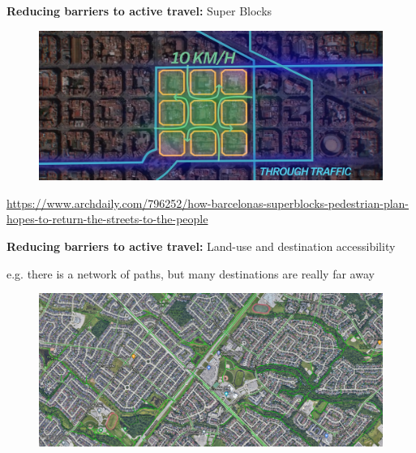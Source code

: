 \documentclass[aspectratio=169]{beamer}
\begin{document}
\begin{frame}
	
	\textbf{Reducing barriers to active travel:} Super Blocks
	
	\begin{figure}
		\centering
		\includegraphics[width=0.8\linewidth]{images/super_blocks.png}
	\end{figure}
	
	\tiny 
	\url{https://www.archdaily.com/796252/how-barcelonas-superblocks-pedestrian-plan-hopes-to-return-the-streets-to-the-people}
	
	
	
\end{frame}



\begin{frame}
	
	\textbf{Reducing barriers to active travel:} Land-use and destination accessibility
	
	\vspace{2mm}
	
	e.g. there is a network of paths, but many destinations are really far away
	
	\begin{figure}
		\centering
		\includegraphics[width=1\linewidth]{images/suburb_bike_lanes.png}
	\end{figure}
	
%	
%	
%	
		
\end{frame}
\end{document}
